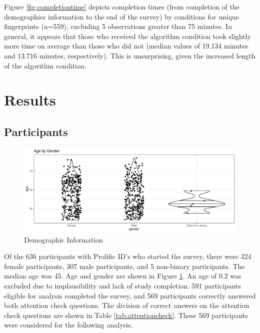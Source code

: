 \documentclass[print]{nuthesis}
\begin{document}
Figure \ref{fig:completiontime} depicts completion times (from completion of the demographics information to the end of the survey) by conditions for unique fingerprints (n=559), excluding 5 observations greater than 75 minutes. In general, it appears that those who received the algorithm condition took slightly more time on average than those who did not (median values of 19.134 minutes and 13.716 minutes, respectively). This is unsurprising, given the increased length of the algorithm condition.

\hypertarget{results}{%
\section{Results}\label{results}}


\hypertarget{participants}{%
\subsection{Participants}\label{participants}}

\begin{figure}

{\centering \includegraphics[width=\linewidth]{thesis_files/figure-latex/demographics-1} 

}

\caption{Demographic Information}\label{fig:demographics}
\end{figure}

Of the 636 participants with Prolific ID's who started the survey, there were 324 female participants, 307 male participants, and 5 non-binary participants.
The median age was 45.
Age and gender are shown in Figure \ref{fig:demographics}.
An age of 0.2 was excluded due to implausibility and lack of study completion.
591 participants eligible for analysis completed the survey, and 569 participants correctly answered both attention check questions.
The division of correct answers on the attention check questions are shown in Table \ref{tab:attentioncheck}.
These 569 participants were considered for the following analysis.
\end{document}
